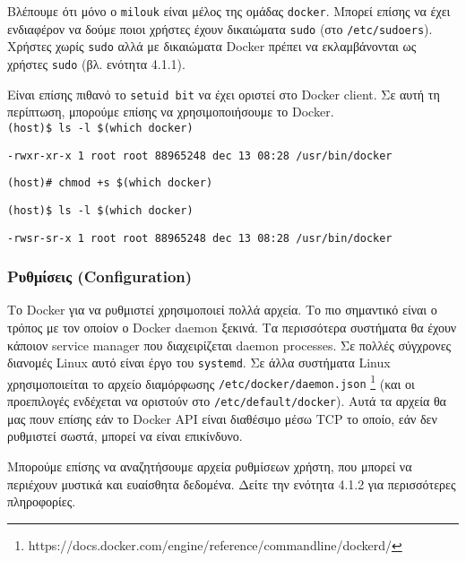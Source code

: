 Βλέπουμε ότι μόνο ο \texttt{\textlatin{milouk}} είναι μέλος της ομάδας
\texttt{\textlatin{docker}}. Μπορεί επίσης να έχει ενδιαφέρον να δούμε ποιοι
χρήστες έχουν δικαιώματα \texttt{\textlatin{sudo}} (στο
\texttt{\textlatin{/etc/sudoers}}). Χρήστες χωρίς \texttt{\textlatin{sudo}} αλλά
με δικαιώματα \textlatin{Docker} πρέπει να εκλαμβάνονται ως χρήστες
\texttt{\textlatin{sudo}} (βλ. ενότητα 4.1.1).

Είναι επίσης πιθανό το \texttt{\textlatin{setuid bit}} να έχει οριστεί στο
\textlatin{Docker client}. Σε αυτή τη περίπτωση, μπορούμε επίσης να
χρησιμοποιήσουμε το \textlatin{Docker}. \\

\texttt{\textlatin{(host)\$ ls -l \$(which docker)}}

\texttt{\textlatin{-rwxr-xr-x 1 root root 88965248 dec 13 08:28 /usr/bin/docker}}

\texttt{\textlatin{(host)\# chmod +s \$(which docker)}}

\texttt{\textlatin{(host)\$ ls -l \$(which docker)}}

\texttt{\textlatin{-rwsr-sr-x 1 root root 88965248 dec 13 08:28 /usr/bin/docker}} \\

\subsubsection{Ρυθμίσεις (\textlatin{Configuration})}

Το \textlatin{Docker} για να ρυθμιστεί χρησιμοποιεί πολλά αρχεία. Το πιο
σημαντικό είναι ο τρόπος με τον οποίον ο \textlatin{Docker daemon} ξεκινά. Τα
περισσότερα συστήματα θα έχουν κάποιον \textlatin{service manager} που
διαχειρίζεται \textlatin{daemon processes}. Σε πολλές σύγχρονες διανομές
\textlatin{Linux} αυτό είναι έργο του \texttt{\textlatin{systemd}}. Σε άλλα
συστήματα \textlatin{Linux} χρησιμοποιείται το αρχείο διαμόρφωσης
\texttt{\textlatin{/etc/docker/daemon.json}}
\footnote{\textlatin{https://docs.docker.com/engine/reference/commandline/dockerd/}}
(και οι προεπιλογές ενδέχεται να οριστούν στο
\texttt{\textlatin{/etc/default/docker}}). Αυτά τα αρχεία θα μας πουν επίσης εάν
το \textlatin{Docker API} είναι διαθέσιμο μέσω \textlatin{TCP} το οποίο, εάν δεν
ρυθμιστεί σωστά, μπορεί να είναι επικίνδυνο.

Μπορούμε επίσης να αναζητήσουμε αρχεία ρυθμίσεων χρήστη, που μπορεί να περιέχουν
μυστικά και ευαίσθητα δεδομένα. Δείτε την ενότητα 4.1.2 για περισσότερες
πληροφορίες.

